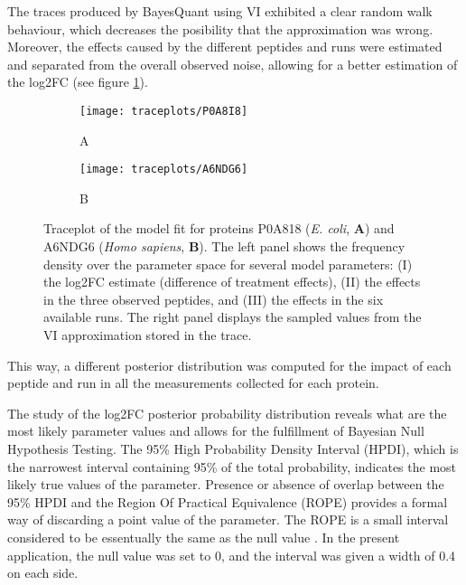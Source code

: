 The traces produced by BayesQuant using \ac{VI} exhibited a clear random walk behaviour, which decreases the posibility that the approximation was wrong. Moreover, the  effects caused by the different peptides and runs were estimated and separated from the overall observed noise, allowing for a better estimation of the \ac{log2FC} (see figure \ref{fig:traceplots}).

\begin{figure}[!h]
\begin{subfigure}{\textwidth}
\centering
\caption*{A}
\texttt{[image: traceplots/P0A8I8]}
\end{subfigure}
\bigskip
\begin{subfigure}{\textwidth}
\centering
\caption*{B}
\texttt{[image: traceplots/A6NDG6]}
\end{subfigure}
\caption[Traceplots for 2 proteins]{Traceplot of the model fit for proteins P0A818 (\textit{E. coli}, \textbf{A}) and A6NDG6 (\textit{Homo sapiens}, \textbf{B}). The left panel shows the frequency density over the parameter space for several model parameters: (I) the \ac{log2FC} estimate (difference of treatment effects), (II) the effects in the three observed peptides, and (III) the effects in the six available runs. The right panel displays the sampled values from the \ac{VI} approximation stored in the trace.}
\label{fig:traceplots}
\end{figure}

This way, a different posterior distribution was computed for the impact of each peptide and run in all the measurements collected for each protein.



The study of the \ac{log2FC} posterior probability distribution reveals what are the most likely parameter values and allows for the fulfillment of Bayesian Null Hypothesis Testing. The 95\% High Probability Density Interval (\ac{HPDI}), which is the narrowest interval containing 95\% of the total probability, indicates the most likely true values of the parameter. Presence or absence of overlap between the 95\% \ac{HPDI} and the Region Of Practical Equivalence (\ac{ROPE}) provides a formal way of discarding a point value of the parameter. The \ac{ROPE} is a small interval considered to be essentually the same as the null value \cite{Kruschke}. In the present application, the null value was set to 0, and the interval was given a width of 0.4 on each side.

